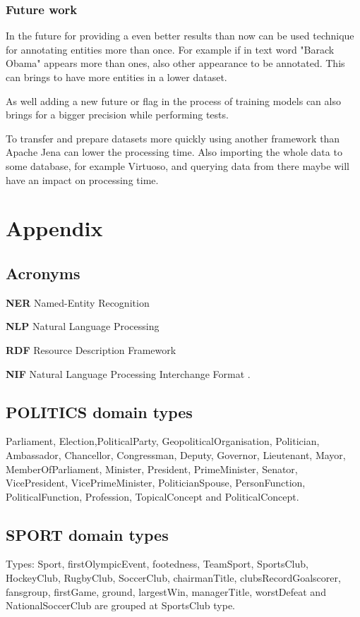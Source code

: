 \documentclass[thesis=M,english]{FITthesis}[2018/05/30]
\begin{document}
\begin{conclusion}
\subsection{Future work}
	
	 In the future for providing a even better results than now can be used technique for annotating entities more than once. For example if in text word "Barack Obama" appears more than ones, also other appearance to be annotated. This can brings to have more entities in a lower dataset.
	 
	 As well adding a new future or flag in the process of training models can also brings for a bigger precision while performing tests. 
	 
	 To transfer and prepare datasets more quickly using another framework than Apache Jena can lower the processing time. Also importing the whole data to some database, for example Virtuoso, and querying data from there maybe will have an impact on processing time.

\end{conclusion}






\appendix
\chapter{Appendix}

\section{Acronyms}
\textbf{NER} Named-Entity Recognition

\textbf{NLP} Natural Language Processing

\textbf{RDF} Resource Description Framework

\textbf{NIF} Natural Language Processing Interchange Format
.

\section{POLITICS domain types}\label{PoliticsTypes}
Parliament, Election,PoliticalParty, GeopoliticalOrganisation, Politician, Ambassador, Chancellor, Congressman, Deputy, Governor, Lieutenant, Mayor, MemberOfParliament, Minister, President, PrimeMinister, Senator, VicePresident, VicePrimeMinister, PoliticianSpouse, PersonFunction, PoliticalFunction, Profession, TopicalConcept and PoliticalConcept.

\section{SPORT domain types}\label{SportTypes}
Types: Sport, firstOlympicEvent, footedness, TeamSport, SportsClub, HockeyClub, RugbyClub, SoccerClub, chairmanTitle, clubsRecordGoalscorer, fansgroup, firstGame, ground, largestWin, managerTitle, worstDefeat and NationalSoccerClub are grouped at SportsClub type.
\end{document}
